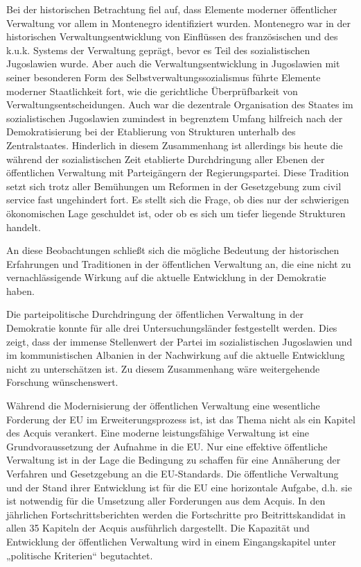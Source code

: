 Bei der historischen Betrachtung fiel auf, dass Elemente moderner öffentlicher Verwaltung vor allem in Montenegro identifiziert wurden. Montenegro war in der historischen Verwaltungsentwicklung von Einflüssen des französischen und des k.u.k. Systems der Verwaltung geprägt, bevor es Teil des sozialistischen Jugoslawien wurde. Aber auch die Verwaltungsentwicklung in Jugoslawien mit seiner besonderen Form des Selbstverwaltungssozialismus führte Elemente moderner Staatlichkeit fort, wie die gerichtliche Überprüfbarkeit von Verwaltungsentscheidungen. Auch war die dezentrale Organisation des Staates im sozialistischen Jugoslawien zumindest in begrenztem Umfang hilfreich nach der Demokratisierung bei der Etablierung von Strukturen unterhalb des Zentralstaates. Hinderlich in diesem Zusammenhang ist allerdings bis heute die während der sozialistischen Zeit etablierte Durchdringung aller Ebenen der öffentlichen Verwaltung mit Parteigängern der Regierungspartei. Diese Tradition setzt sich trotz aller Bemühungen um Reformen in der Gesetzgebung zum civil service fast ungehindert fort. Es stellt sich die Frage, ob dies nur der schwierigen ökonomischen Lage geschuldet ist, oder ob es sich um tiefer liegende Strukturen handelt. \par
An diese Beobachtungen schließt sich die mögliche Bedeutung der historischen Erfahrungen und Traditionen in der öffentlichen Verwaltung an, die eine nicht zu vernachlässigende Wirkung auf die aktuelle Entwicklung in der Demokratie haben. \par
Die parteipolitische Durchdringung der öffentlichen Verwaltung in der Demokratie konnte für alle drei Untersuchungsländer festgestellt werden. Dies zeigt, dass der immense Stellenwert der Partei im sozialistischen Jugoslawien und im kommunistischen Albanien in der Nachwirkung auf die aktuelle Entwicklung nicht zu unterschätzen ist. Zu diesem Zusammenhang wäre weitergehende Forschung wünschenswert. \par
 Während die Modernisierung der öffentlichen Verwaltung eine wesentliche Forderung der EU im Erweiterungsprozess ist, ist das Thema nicht als ein Kapitel des Acquis verankert. Eine moderne leistungsfähige Verwaltung ist eine Grundvoraussetzung der Aufnahme in die EU. Nur eine effektive öffentliche Verwaltung ist in der Lage die Bedingung zu schaffen für eine Annäherung der Verfahren und Gesetzgebung an die EU-Standards. Die öffentliche Verwaltung und der Stand ihrer Entwicklung ist für die EU eine horizontale Aufgabe, d.h. sie ist notwendig für die Umsetzung aller Forderungen aus dem Acquis. In den jährlichen Fortschrittsberichten werden die Fortschritte pro Beitrittskandidat in allen 35 Kapiteln der Acquis ausführlich dargestellt. Die Kapazität und Entwicklung der öffentlichen Verwaltung wird in einem Eingangskapitel unter „politische Kriterien“ begutachtet.\par

